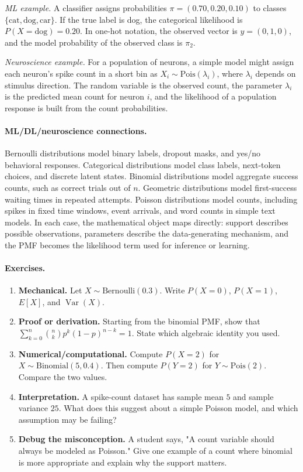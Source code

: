 \emph{ML example.} A classifier assigns probabilities \(\pi=(0.70,0.20,0.10)\) to classes \(\{\text{cat},\text{dog},\text{car}\}\). If the true label is dog, the categorical likelihood is \(P(X=\text{dog})=0.20\). In one-hot notation, the observed vector is \(y=(0,1,0)\), and the model probability of the observed class is \(\pi_2\).

\emph{Neuroscience example.} For a population of neurons, a simple model might assign each neuron's spike count in a short bin as \(X_i\sim\mathrm{Pois}(\lambda_i)\), where \(\lambda_i\) depends on stimulus direction. The random variable is the observed count, the parameter \(\lambda_i\) is the predicted mean count for neuron \(i\), and the likelihood of a population response is built from the count probabilities.

\paragraph{ML/DL/neuroscience connections.}
Bernoulli distributions model binary labels, dropout masks, and yes/no behavioral responses. Categorical distributions model class labels, next-token choices, and discrete latent states. Binomial distributions model aggregate success counts, such as correct trials out of \(n\). Geometric distributions model first-success waiting times in repeated attempts. Poisson distributions model counts, including spikes in fixed time windows, event arrivals, and word counts in simple text models. In each case, the mathematical object maps directly: support describes possible observations, parameters describe the data-generating mechanism, and the PMF becomes the likelihood term used for inference or learning.

\paragraph{Exercises.}
\begin{enumerate}[label=\textbf{14.1.\arabic*.}, leftmargin=*]
\item \textbf{Mechanical.} Let \(X\sim\mathrm{Bernoulli}(0.3)\). Write \(P(X=0)\), \(P(X=1)\), \(E[X]\), and \(\operatorname{Var}(X)\).
\item \textbf{Proof or derivation.} Starting from the binomial PMF, show that \(\sum_{k=0}^n \binom nk p^k(1-p)^{n-k}=1\). State which algebraic identity you used.
\item \textbf{Numerical/computational.} Compute \(P(X=2)\) for \(X\sim\mathrm{Binomial}(5,0.4)\). Then compute \(P(Y=2)\) for \(Y\sim\mathrm{Pois}(2)\). Compare the two values.
\item \textbf{Interpretation.} A spike-count dataset has sample mean \(5\) and sample variance \(25\). What does this suggest about a simple Poisson model, and which assumption may be failing?
\item \textbf{Debug the misconception.} A student says, "A count variable should always be modeled as Poisson." Give one example of a count where binomial is more appropriate and explain why the support matters.
\end{enumerate}

